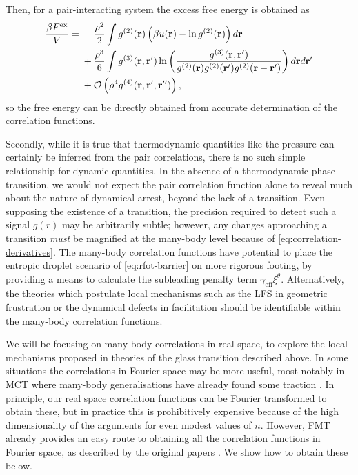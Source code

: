 \documentclass[11pt,twoside]{report}
\begin{document}
Then, for a pair-interacting system the excess free energy is obtained as
\begin{equation*}
  \begin{split}
    \frac{\beta F^\mathrm{ex}}{V}
    =& \; \hphantom{ + } \;\,
    \frac{\rho^2}{2} \int g^{(2)}(\vec{r})
    \left( \beta u(\vec{r}) - \ln{g^{(2)}(\vec{r})} \right)
    d\vec{r}
    \\ & \;
    + \frac{\rho^3}{6}
    \int g^{(3)}(\vec{r}, \vec{r}')
    \ln{\left(
      \frac{
        g^{(3)}(\vec{r}, \vec{r}')
      }{
        g^{(2)}(\vec{r}) g^{(2)}(\vec{r}') g^{(2)}(\vec{r} - \vec{r}')
      }
      \right)}
    \, d\vec{r} d\vec{r}'
    \\ & \;
    + \mathcal{O}\left( \rho^4 g^{(4)}(\vec{r}, \vec{r}', \vec{r}'') \right),
  \end{split}
\end{equation*}
so the free energy can be directly obtained from accurate determination of the correlation functions.

Secondly, while it is true that thermodynamic quantities like the pressure can certainly be inferred from the pair correlations, there is no such simple relationship for dynamic quantities.
In the absence of a thermodynamic phase transition, we would not expect the pair correlation function alone to reveal much about the nature of dynamical arrest, beyond the lack of a transition.
Even supposing the existence of a transition, the precision required to detect such a signal $g(r)$ may be arbitrarily subtle; however, any changes approaching a transition \emph{must} be magnified at the many-body level because of \eqref{eq:correlation-derivatives}.
The many-body correlation functions have potential to place the entropic droplet scenario of \eqref{eq:rfot-barrier} on more rigorous footing, by providing a means to calculate the subleading penalty term $\gamma_\mathrm{eff} \xi^\theta$.
Alternatively, the theories which postulate local mechanisms such as the LFS in geometric frustration or the dynamical defects in facilitation should be identifiable within the many-body correlation functions.

We will be focusing on many-body correlations in real space, to explore the local mechanisms proposed in theories of the glass transition described above.
In some situations the correlations in Fourier space may be more useful, most notably in MCT where many-body generalisations have already found some traction \cite{JanssenPRL2015,JanssenFP2018}.
In principle, our real space correlation functions can be Fourier transformed to obtain these, but in practice this is prohibitively expensive because of the high dimensionality of the arguments for even modest values of $n$.
However, FMT already provides an easy route to obtaining all the correlation functions in Fourier space, as described by the original papers \cite{RosenfeldPRL1989,RosenfeldJCP1990}.
We show how to obtain these below.
\end{document}

